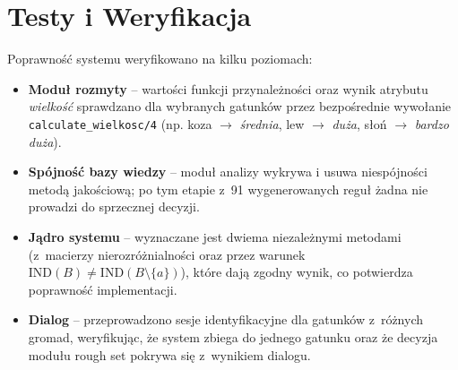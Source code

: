 \documentclass[11pt,a4paper]{article}
\newcommand{\code}[1]{\texttt{#1}}
\begin{document}
\section{Testy i Weryfikacja}
Poprawność systemu weryfikowano na kilku poziomach:
\begin{itemize}[noitemsep]
    \item \textbf{Moduł rozmyty} -- wartości funkcji przynależności oraz wynik
          atrybutu \textit{wielkość} sprawdzano dla wybranych gatunków przez
          bezpośrednie wywołanie \code{calculate\_wielkosc/4} (np. koza
          $\rightarrow$ \textit{średnia}, lew $\rightarrow$ \textit{duża}, słoń
          $\rightarrow$ \textit{bardzo duża}).
    \item \textbf{Spójność bazy wiedzy} -- moduł analizy wykrywa i usuwa
          niespójności metodą jakościową; po tym etapie z~91 wygenerowanych
          reguł żadna nie prowadzi do sprzecznej decyzji.
    \item \textbf{Jądro systemu} -- wyznaczane jest dwiema niezależnymi metodami
          (z~macierzy nierozróżnialności oraz przez warunek
          $\mathrm{IND}(B)\ne\mathrm{IND}(B\setminus\{a\})$), które dają zgodny
          wynik, co potwierdza poprawność implementacji.
    \item \textbf{Dialog} -- przeprowadzono sesje identyfikacyjne dla gatunków
          z~różnych gromad, weryfikując, że system zbiega do jednego gatunku oraz
          że decyzja modułu rough set pokrywa się z~wynikiem dialogu.
\end{itemize}

\end{document}
